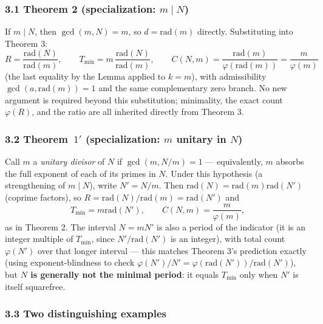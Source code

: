 \documentclass[
]{article}
\begin{document}
\subsubsection{\texorpdfstring{3.1 Theorem 2 (specialization:
\(m\mid N\))}{3.1 Theorem 2 (specialization: m\textbackslash mid N)}}\label{theorem-2-specialization-mmid-n}

If \(m\mid N\), then \(\gcd(m,N)=m\), so \(d=\mathrm{rad}(m)\) directly.
Substituting into Theorem 3: \[
R = \frac{\mathrm{rad}(N)}{\mathrm{rad}(m)}, \qquad T_{\min} = m\,\frac{\mathrm{rad}(N)}{\mathrm{rad}(m)}, \qquad C(N,m) = \frac{\mathrm{rad}(m)}{\varphi(\mathrm{rad}(m))} = \frac{m}{\varphi(m)}
\] (the last equality by the Lemma applied to \(k=m\)), with
admissibility \(\gcd(a,\mathrm{rad}(m))=1\) and the same complementary
zero branch. No new argument is required beyond this substitution;
minimality, the exact count \(\varphi(R)\), and the ratio are all
inherited directly from Theorem 3.

\subsubsection{\texorpdfstring{3.2 Theorem~\(1'\) (specialization: \(m\)
unitary in
\(N\))}{3.2 Theorem 1' (specialization: m unitary in N)}}\label{theorem-1-specialization-m-unitary-in-n}

Call \(m\) a \emph{unitary divisor} of \(N\) if \(\gcd(m,N/m)=1\) ---
equivalently, \(m\) absorbs the full exponent of each of its primes in
\(N\). Under this hypothesis (a strengthening of \(m\mid N\)), write
\(N'=N/m\). Then \(\mathrm{rad}(N)=\mathrm{rad}(m)\mathrm{rad}(N')\)
(coprime factors), so
\(R=\mathrm{rad}(N)/\mathrm{rad}(m)=\mathrm{rad}(N')\) and \[
T_{\min} = m\mathrm{rad}(N'), \qquad C(N,m)=\frac{m}{\varphi(m)},
\] as in Theorem 2. The interval \(N=mN'\) is also a period of the
indicator (it is an integer multiple of \(T_{\min}\), since
\(N'/\mathrm{rad}(N')\) is an integer), with total count \(\varphi(N')\)
over that longer interval --- this matches Theorem 3's prediction
exactly (using exponent-blindness to check
\(\varphi(N')/N'=\varphi(\mathrm{rad}(N'))/\mathrm{rad}(N')\)), but
\textbf{\(N\) is generally not the minimal period}: it equals
\(T_{\min}\) only when \(N'\) is itself squarefree.

\subsubsection{3.3 Two distinguishing
examples}\label{two-distinguishing-examples}
\end{document}

